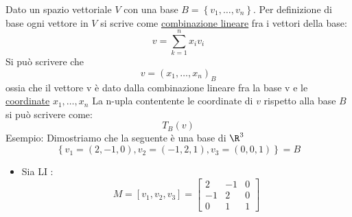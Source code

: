 Dato un spazio vettoriale $V$ con una base $B=\left\{ v_1,\ldots,v_n \right\} $. Per definizione di base ogni vettore in $V$ si scrive come \underline{combinazione lineare} fra i vettori della base:
\[
	v= \sum_{k=1}^{n} x_iv_i
\]
Si può scrivere che
\[
	v = \left( x_1,\ldots,x_n \right) _B
\]
ossia che il vettore v è dato dalla combinazione lineare fra la base v e  le \underline{coordinate} $x_1,\ldots,x_n$
\vskip3mm
La n-upla contentente le coordinate di $v$ rispetto alla base $B$ si può scrivere come:
\[
	T_B\left( v \right)
\]
\hr
Esempio:
Dimostriamo che la seguente è una base di $\R^{3}$
\[
	\left\{ v_1 = \left( 2,-1,0 \right) , v_2 = \left( -1,2,1 \right) , v_3=\left( 0,0,1 \right)  \right\} = B
\]
\begin{itemize}
	\item Sia LI :
	      \[
		      M = \left[ v_1,v_2,v_3 \right] =
		      \begin{bmatrix}
			      2  & -1 & 0 \\
			      -1 & 2  & 0 \\
			      0  & 1  & 1
		      \end{bmatrix}
	      \]
\end{itemize}
